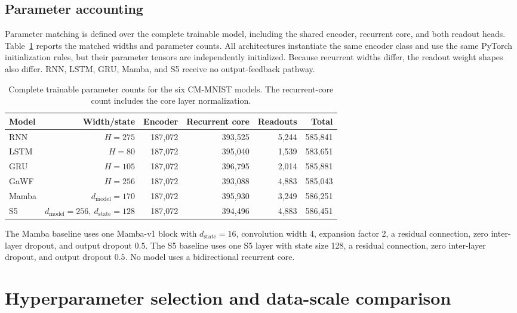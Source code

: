 \subsection{Parameter accounting}

Parameter matching is defined over the complete trainable model, including the shared encoder, recurrent core, and both readout heads. Table~\ref{tab:model-parameters} reports the matched widths and parameter counts. All architectures instantiate the same encoder class and use the same PyTorch initialization rules, but their parameter tensors are independently initialized. Because recurrent widths differ, the readout weight shapes also differ. RNN, LSTM, GRU, Mamba, and S5 receive no output-feedback pathway.

\begin{table}[t]
\centering
\caption{Complete trainable parameter counts for the six CM-MNIST models. The recurrent-core count includes the core layer normalization.}
\label{tab:model-parameters}
\begin{tabular}{lrrrrr}
\toprule
Model & Width/state & Encoder & Recurrent core & Readouts & Total \\
\midrule
RNN & \(H=275\) & 187,072 & 393,525 & 5,244 & 585,841 \\
LSTM & \(H=80\) & 187,072 & 395,040 & 1,539 & 583,651 \\
GRU & \(H=105\) & 187,072 & 396,795 & 2,014 & 585,881 \\
GaWF & \(H=256\) & 187,072 & 393,088 & 4,883 & 585,043 \\
Mamba & \(d_{\mathrm{model}}=170\) & 187,072 & 395,930 & 3,249 & 586,251 \\
S5 & \(d_{\mathrm{model}}=256,\ d_{\mathrm{state}}=128\) & 187,072 & 394,496 & 4,883 & 586,451 \\
\bottomrule
\end{tabular}
\end{table}

The Mamba baseline uses one Mamba-v1 block with \(d_{\mathrm{state}}=16\), convolution width 4, expansion factor 2, a residual connection, zero inter-layer dropout, and output dropout \(0.5\). The S5 baseline uses one S5 layer with state size 128, a residual connection, zero inter-layer dropout, and output dropout \(0.5\). No model uses a bidirectional recurrent core.

\section{Hyperparameter selection and data-scale comparison}
\label{app:hparams}

